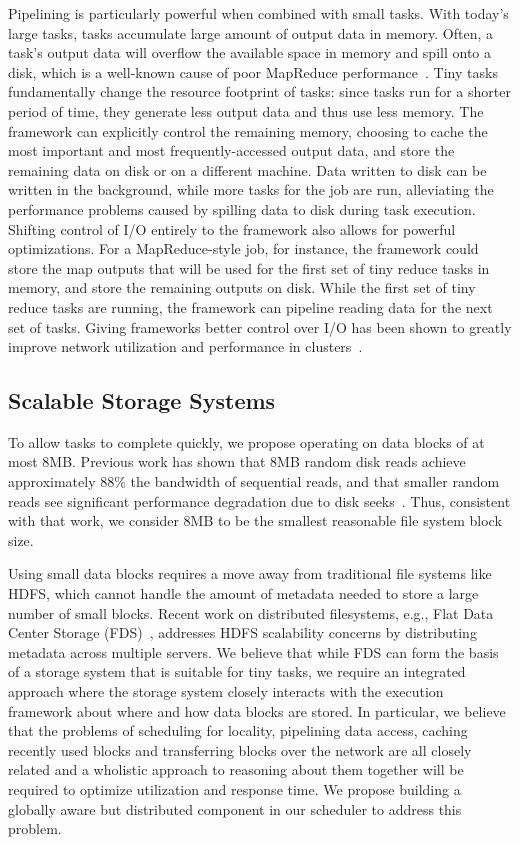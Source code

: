 Pipelining is particularly powerful when combined with small tasks. With
today's large tasks, tasks accumulate large amount of output data in memory.
Often, a task's output data will overflow the available space in memory
and spill onto a disk, which is a well-known cause of poor MapReduce
performance~\cite{lipcon2012optimizing}. Tiny tasks fundamentally change the
resource footprint of tasks: since tasks run for a shorter period of time,
they generate less output data and thus use less memory. The framework can
explicitly control the remaining memory, choosing to cache the most important
and most frequently-accessed output data, and store the remaining data on disk
or on a different machine. Data written to disk can be written in the
background, while more tasks for the job are run, alleviating the performance
problems caused by spilling data to disk during task execution.
Shifting control of I/O entirely to the framework also allows for
powerful optimizations.  For a MapReduce-style job, for instance, the
framework could store the map outputs that will be used for the first set of
tiny reduce tasks in memory, and store the remaining outputs on disk. While
the first set of tiny reduce tasks are running, the framework can pipeline
reading data for the next set of tasks.  Giving frameworks better control over
I/O has been shown
to greatly improve network utilization and performance in
clusters~\cite{chowdhury2011managing, chowdhury2012coflow}.

\subsection{Scalable Storage Systems}
To allow tasks to complete quickly, we propose operating on data blocks of
at most $8$MB. Previous work has shown that $8$MB random disk reads achieve
approximately $88$\% the bandwidth of sequential reads, and that smaller random
reads see significant performance degradation due to disk
seeks~\cite{nightingale2012flat}. Thus, consistent with that work, we consider
$8$MB to be the smallest reasonable file system block size.

Using small data blocks requires a move away from traditional file systems like
HDFS, which cannot handle the amount of metadata needed to store a large number
of small blocks.  Recent work on distributed filesystems, e.g., Flat Data Center
Storage (FDS)~\cite{nightingale2012flat}, addresses HDFS scalability concerns by
distributing metadata across multiple servers. We believe that while FDS can
form the basis of a storage system that is suitable for tiny tasks, we require
an integrated approach where the storage system closely interacts with the
execution framework about where and how data blocks are stored. In particular,
we believe that the problems of scheduling for locality, pipelining data access,
caching recently used blocks and transferring blocks over the network are all
closely related and a wholistic approach to reasoning about them together will
be required to optimize utilization and response time. We propose building a 
globally aware but distributed component in our scheduler to address this
problem.


